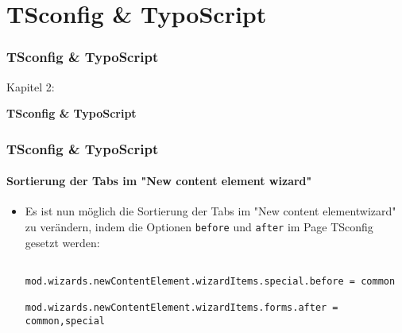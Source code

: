 %

\section{TSconfig \& TypoScript}
\begin{frame}[fragile]
	\frametitle{TSconfig \& TypoScript}

	\begin{center}\huge{Kapitel 2:}\end{center}
	\begin{center}\huge{\color{typo3darkgrey}\textbf{TSconfig \& TypoScript}}\end{center}

\end{frame}

\begin{frame}[fragile]
	\frametitle{TSconfig \& TypoScript}
	\framesubtitle{Sortierung der Tabs im "New content element wizard"}

	\lstset{basicstyle=\tiny\ttfamily}

	\begin{itemize}
		\item Es ist nun möglich die Sortierung der Tabs im "New content elementwizard"  zu verändern, indem die Optionen \texttt{before} und \texttt{after} im Page TSconfig gesetzt werden:

			\begin{lstlisting}
				mod.wizards.newContentElement.wizardItems.special.before = common
				mod.wizards.newContentElement.wizardItems.forms.after = common,special
			\end{lstlisting}

	\end{itemize}

\end{frame}

